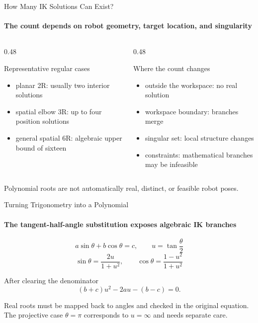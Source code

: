 \documentclass[aspectratio=169]{beamer}
\begin{document}
\begin{frame}[t]{How Many IK Solutions Can Exist?}
    \framesubtitle{The count depends on robot geometry, target location, and singularity}
    \begin{columns}[T,onlytextwidth]
        \begin{column}{0.48\textwidth}
            \begin{block}{Representative regular cases}
                \begin{itemize}
                    \item planar 2R: usually two interior solutions
                    \item spatial elbow 3R: up to four position solutions
                    \item general spatial 6R: algebraic upper bound of sixteen
                \end{itemize}
            \end{block}
        \end{column}
        \begin{column}{0.48\textwidth}
            \begin{block}{Where the count changes}
                \begin{itemize}
                    \item outside the workspace: no real solution
                    \item workspace boundary: branches merge
                    \item singular set: local structure changes
                    \item constraints: mathematical branches may be infeasible
                \end{itemize}
            \end{block}
        \end{column}
    \end{columns}
    \medskip
    \centering
    \alert{Polynomial roots are not automatically real, distinct, or feasible robot poses.}
\end{frame}

\begin{frame}[t]{Turning Trigonometry into a Polynomial}
    \framesubtitle{The tangent-half-angle substitution exposes algebraic IK branches}
    \[
        a\sin\theta+b\cos\theta=c,
        \qquad
        u=\tan\frac{\theta}{2}
    \]
    \[
        \sin\theta=\frac{2u}{1+u^2},
        \qquad
        \cos\theta=\frac{1-u^2}{1+u^2}
    \]
    \begin{block}{After clearing the denominator}
        \[
            (b+c)u^2-2au-(b-c)=0.
        \]
    \end{block}
    \small
    Real roots must be mapped back to angles and checked in the original equation.
    The projective case $\theta=\pi$ corresponds to $u=\infty$ and needs separate care.
\end{frame}
\end{document}
